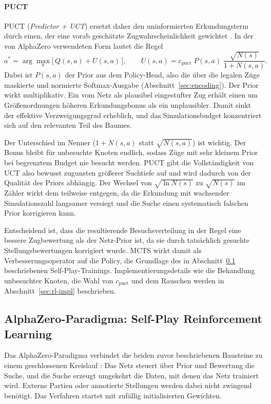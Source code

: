 \documentclass[
  a4paper, 12pt,
  parskip=half,
  headings=small,
  bibliography=totoc
]{scrartcl}
\begin{document}
\paragraph{PUCT} PUCT (\emph{Predictor + UCT}) ersetzt daher den uninformierten Erkundungsterm durch einen, der eine vorab geschätzte Zugwahrscheinlichkeit gewichtet \autocite{rosin2011multi}. In der von AlphaZero verwendeten Form \parencite{silver2018} lautet die Regel
\[
  a^{*} = \arg\max_{a}\bigl[\,Q(s,a) + U(s,a)\,\bigr],
  \qquad
  U(s,a) = c_{\mathrm{puct}}\; P(s,a)\;
           \frac{\sqrt{N(s)}}{1 + N(s,a)} .
\]
Dabei ist \(P(s,a)\) der Prior aus dem Policy-Head, also die über die legalen Züge maskierte und normierte Softmax-Ausgabe (Abschnitt~\ref{sec:encoding}). Der Prior wirkt multiplikativ. Ein vom Netz als plausibel eingestufter Zug erhält einen um Größenordnungen höheren Erkundungsbonus als ein unplausibler. Damit sinkt der effektive Verzweigungsgrad erheblich, und das Simulationsbudget konzentriert sich auf den relevanten Teil des Baumes.

Der Unterschied im Nenner (\(1 + N(s,a)\) statt \(\sqrt{N(s,a)}\)) ist wichtig. Der Bonus bleibt für unbesuchte Knoten endlich, sodass Züge mit sehr kleinem Prior bei begrenztem Budget nie besucht werden. 
PUCT gibt die Vollständigkeit von UCT also bewusst zugunsten größerer Suchtiefe auf und wird dadurch von der Qualität des Priors abhängig. Der Wechsel von \(\sqrt{\ln N(s)}\) zu \(\sqrt{N(s)}\) im Zähler wirkt dem teilweise entgegen, da die Erkundung mit wachsender Simulationszahl langsamer versiegt und die Suche einen systematisch falschen Prior korrigieren kann.

Entscheidend ist, dass die resultierende Besuchsverteilung in der Regel eine bessere Zugbewertung als der Netz-Prior ist, da sie durch tatsächlich gesuchte Stellungsbewertungen korrigiert wurde. 
MCTS wirkt damit als Verbesserungsoperator auf die Policy, die Grundlage des in Abschnitt~\ref{sec:alphazero} beschriebenen Self-Play-Trainings. Implementierungsdetails wie die Behandlung unbesuchter Knoten, die Wahl von \(c_{\mathrm{puct}}\) und dem Rauschen werden in Abschnitt~\ref{sec:rl-impl} beschrieben.

\subsection{AlphaZero-Paradigma: Self-Play Reinforcement Learning}\label{sec:alphazero} %
Das AlphaZero-Paradigma verbindet die beiden zuvor beschriebenen Bausteine zu einem geschlossenen Kreislauf \parencite{silver2017mastering, silver2018}: Das Netz steuert über Prior und Bewertung die Suche, und die Suche erzeugt umgekehrt die Daten, mit denen das Netz trainiert wird. Externe Partien oder annotierte Stellungen werden dabei nicht zwingend benötigt. Das Verfahren startet mit zufällig initialisierten Gewichten.
\end{document}

